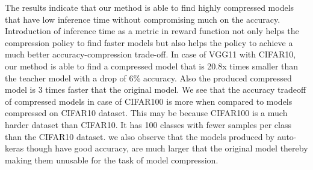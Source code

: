 \documentclass[../main]{subfiles}
\begin{document}
        The results indicate that our method is able to find highly compressed models that have low inference time without compromising much on the accuracy.
        Introduction of inference time as a metric in reward function not only helps the compression policy to find faster models but also helps the policy to achieve a much better accuracy-compression trade-off.
        In case of VGG11 with CIFAR10,  our method is able to find a compressed model that is 20.8x times smaller than the teacher model with a drop of 6\% accuracy.
        Also the produced compressed model is 3 times faster that the original model.
        We see that the accuracy tradeoff of compressed models in case of CIFAR100 is more when compared to models compressed on CIFAR10 dataset.
        This may be because CIFAR100 is a much harder dataset than CIFAR10.
        It has 100 classes with fewer samples per class than the CIFAR10 dataset. we also observe that the models produced by auto-keras though have good accuracy, are much larger that the original model thereby making them unusable for the task of model compression.
    
\end{document}
